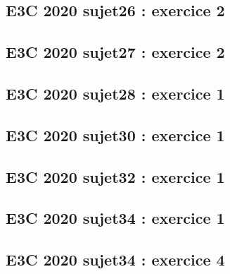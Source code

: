 \documentclass[lang=fr,edition=teacher,layout=sheet]{mxbook}
\begin{document}
\par\bigskip
{}\subsection*{E3C 2020 sujet26 : exercice 2}
\begingroup\endgroup
\par\bigskip
{}\subsection*{E3C 2020 sujet27 : exercice 2}
\begingroup\endgroup
\par\bigskip
{}\subsection*{E3C 2020 sujet28 : exercice 1}
\begingroup\endgroup
\par\bigskip
{}\subsection*{E3C 2020 sujet30 : exercice 1}
\begingroup\endgroup
\par\bigskip
{}\subsection*{E3C 2020 sujet32 : exercice 1}
\begingroup\endgroup
\par\bigskip
{}\subsection*{E3C 2020 sujet34 : exercice 1}
\begingroup\endgroup
\par\bigskip
{}\subsection*{E3C 2020 sujet34 : exercice 4}
\begingroup\endgroup
\par\bigskip
\end{document}
